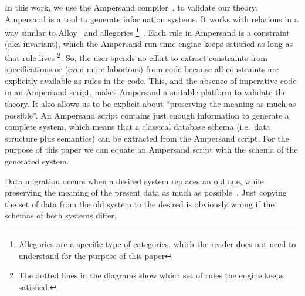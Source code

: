 \documentclass{elsarticle}
\begin{document}
   In this work, we use the Ampersand compiler~\cite{Joosten-JLAMP2018},
   to validate our theory.
   Ampersand is a tool to generate information systems.
   It works with relations in a way similar to Alloy~\cite{Alloy2006} and allegories%
\footnote{Allegories are a specific type of categories, which the reader does not need to understand for the purpose of this paper}~\cite{Zielinski2013}.
   Each rule in Ampersand is a constraint (aka invariant), which the Ampersand run-time engine keeps satisfied as long as that rule lives%
\footnote{The dotted lines in the diagrams show which set of rules the engine keeps satisfied.}.
   So, the user spends no effort to extract constraints from specifications or (even more laborious) from code
   because all constraints are explicitly available as rules in the code.
   This, and the absence of imperative code in an Ampersand script, makes Ampersand a suitable platform to validate the theory.
   It also allows us to be explicit about ``preserving the meaning as much as possible''.
   An Ampersand script contains just enough information to generate a complete system,
   which means that a classical database schema (i.e.\ data structure plus semantics) can be extracted from the Ampersand script.
   For the purpose of this paper we can equate an Ampersand script with the schema of the generated system.

   Data migration occurs when a desired system replaces an old one,
   while preserving the meaning of the present data as much as possible~\cite{Spivak2012}.
   Just copying the set of data from the old system to the desired is obviously wrong if the schemas of both systems differ.
\end{document}

